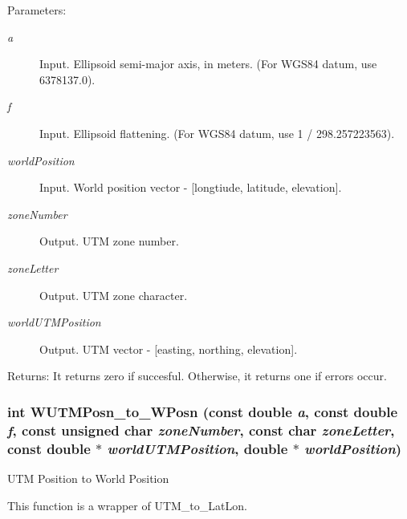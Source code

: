 \begin{Desc}
\item[Parameters:]
\begin{description}
\item[{\em a}]Input. Ellipsoid semi-major axis, in meters. (For WGS84 datum, use 6378137.0). \item[{\em f}]Input. Ellipsoid flattening. (For WGS84 datum, use 1 / 298.257223563). \item[{\em worldPosition}]Input. World position vector - \mbox{[}longtiude, latitude, elevation\mbox{]}. \item[{\em zoneNumber}]Output. UTM zone number. \item[{\em zoneLetter}]Output. UTM zone character. \item[{\em worldUTMPosition}]Output. UTM vector - \mbox{[}easting, northing, elevation\mbox{]}.\end{description}
\end{Desc}
\begin{Desc}
\item[Returns:]It returns zero if succesful. Otherwise, it returns one if errors occur. \end{Desc}
\hypertarget{group__Coordinate_gf60ade188e07bb724c798fbaca99b002}{
\subsubsection[WUTMPosn\_\-to\_\-WPosn]{\setlength{\rightskip}{0pt plus 5cm}int WUTMPosn\_\-to\_\-WPosn (const double {\em a}, \/  const double {\em f}, \/  const unsigned char {\em zoneNumber}, \/  const char {\em zoneLetter}, \/  const double $\ast$ {\em worldUTMPosition}, \/  double $\ast$ {\em worldPosition})}}
\label{group__Coordinate_gf60ade188e07bb724c798fbaca99b002}


UTM Position to World Position 

This function is a wrapper of UTM\_\-to\_\-LatLon.

